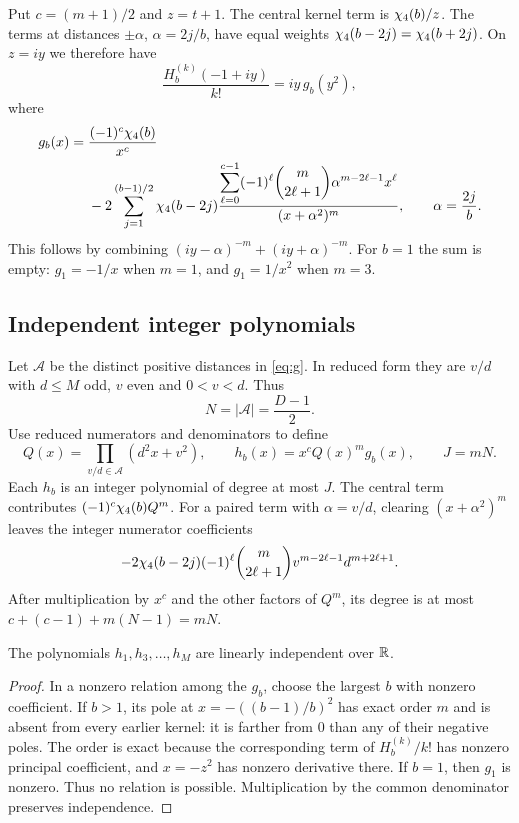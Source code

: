 Put $c=(m+1)/2$ and $z=t+1$. The central kernel term is
$\chi_4(b)/z$. The terms at distances $\pm\alpha$,
$\alpha=2j/b$, have equal weights $\chi_4(b-2j)=\chi_4(b+2j)$.
On $z=iy$ we therefore have
\[
 \frac{H_b^{(k)}(-1+iy)}{k!}=iy\,g_b(y^2),
\]
where
\begin{equation}\label{eq:g}
 \begin{split}
 g_b(x)={}&\frac{(-1)^c\chi_4(b)}{x^c}\\
 &-2\sum_{j=1}^{(b-1)/2}\chi_4(b-2j)
 \frac{\displaystyle\sum_{\ell=0}^{c-1}(-1)^\ell
       \binom m{2\ell+1}\alpha^{m-2\ell-1}x^\ell}
      {(x+\alpha^2)^m},\qquad \alpha=\frac{2j}{b}.
 \end{split}
\end{equation}
This follows by combining $(iy-\alpha)^{-m}+(iy+\alpha)^{-m}$.
For $b=1$ the sum is empty: $g_1=-1/x$ when $m=1$, and
$g_1=1/x^2$ when $m=3$.

\subsection{Independent integer polynomials}

Let $\mathcal A$ be the distinct positive distances in
\eqref{eq:g}. In reduced form they are $v/d$ with $d\le M$
odd, $v$ even and $0<v<d$. Thus
\[
 N=|\mathcal A|=\frac{D-1}{2}.
\]
Use reduced numerators and denominators to define
\begin{equation}\label{eq:Q-h}
 Q(x)=\prod_{v/d\in\mathcal A}(d^2x+v^2),\qquad
 h_b(x)=x^cQ(x)^m g_b(x),\qquad J=mN.
\end{equation}
Each $h_b$ is an integer polynomial of degree at most $J$.
The central term contributes $(-1)^c\chi_4(b)Q^m$. For a paired
term with $\alpha=v/d$, clearing $(x+\alpha^2)^m$ leaves
the integer numerator coefficients
\[
 -2\chi_4(b-2j)(-1)^\ell\binom m{2\ell+1}
                  v^{m-2\ell-1}d^{m+2\ell+1}.
\]
After multiplication by $x^c$ and the other factors of $Q^m$,
its degree is at most $c+(c-1)+m(N-1)=mN$.

\begin{lemma}\label{lem:independence}
The polynomials $h_1,h_3,\ldots,h_M$ are linearly independent
over $\mathbb R$.
\end{lemma}
\begin{proof}
In a nonzero relation among the $g_b$, choose the largest $b$
with nonzero coefficient. If $b>1$, its pole at
$x=-((b-1)/b)^2$ has exact order $m$ and is absent from every
earlier kernel: it is farther from $0$ than any of their
negative poles. The order is exact because the corresponding
term of $H_b^{(k)}/k!$ has nonzero principal coefficient, and
$x=-z^2$ has nonzero derivative there. If $b=1$, then $g_1$
is nonzero. Thus no relation is possible. Multiplication by
the common denominator preserves independence.
\end{proof}

